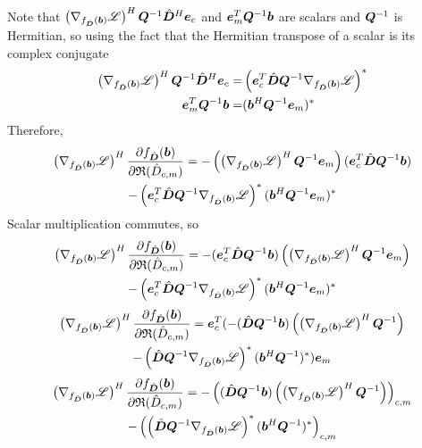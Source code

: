 \begin{appendices}
Note that $\left(\nabla_{f_{\hat{\bm{D}}}(\bm{b})} \mathscr{L}\right)^H\bm{Q}^{-1}\hat{\bm{D}}^H\bm{e}_c$ and $\bm{e}_m^T\bm{Q}^{-1}\bm{b}$ are scalars and $\bm{Q}^{-1}$ is Hermitian, so using the fact that the Hermitian transpose of a scalar is its complex conjugate
\begin{equation}
\begin{split}
\left(\nabla_{f_{\hat{\bm{D}}}(\bm{b})} \mathscr{L}\right)^H\bm{Q}^{-1}\hat{\bm{D}}^H\bm{e}_c = & \left(\bm{e}_c^T\hat{\bm{D}}\bm{Q}^{-1}\nabla_{f_{\hat{\bm{D}}}(\bm{b})} \mathscr{L}\right)^*
\\
\bm{e}_m^T\bm{Q}^{-1}\bm{b} = & (\bm{b}^H\bm{Q}^{-1}\bm{e}_m)^*
\end{split}
\end{equation}
Therefore,
\begin{multline}
\left(\nabla_{f_{\hat{\bm{D}}}(\bm{b})} \mathscr{L}\right)^H\frac{\partial f_{\hat{\bm{D}}}(\bm{b})}{\partial \mathfrak{R}(\hat{D}_{c,m})} = -\left(\left(\nabla_{f_{\hat{\bm{D}}}(\bm{b})} \mathscr{L}\right)^H\bm{Q}^{-1}\bm{e}_m\right)(\bm{e}_c^T\hat{\bm{D}}\bm{Q}^{-1}\bm{b}) \\- \left(\bm{e}_c^T\hat{\bm{D}}\bm{Q}^{-1}\nabla_{f_{\hat{\bm{D}}}(\bm{b})} \mathscr{L}\right)^* (\bm{b}^H\bm{Q}^{-1}\bm{e}_m)^*
\end{multline}
Scalar multiplication commutes, so
\begin{multline}
\left(\nabla_{f_{\hat{\bm{D}}}(\bm{b})} \mathscr{L}\right)^H\frac{\partial f_{\hat{\bm{D}}}(\bm{b})}{\partial \mathfrak{R}(\hat{D}_{c,m})} = -(\bm{e}_c^T\hat{\bm{D}}\bm{Q}^{-1}\bm{b})\left(\left(\nabla_{f_{\hat{\bm{D}}}(\bm{b})} \mathscr{L}\right)^H\bm{Q}^{-1}\bm{e}_m\right) \\- \left(\bm{e}_c^T\hat{\bm{D}}\bm{Q}^{-1}\nabla_{f_{\hat{\bm{D}}}(\bm{b})} \mathscr{L}\right)^* (\bm{b}^H\bm{Q}^{-1}\bm{e}_m)^*
\end{multline}
\begin{multline}
\left(\nabla_{f_{\hat{\bm{D}}}(\bm{b})} \mathscr{L}\right)^H\frac{\partial f_{\hat{\bm{D}}}(\bm{b})}{\partial \mathfrak{R}(\hat{D}_{c,m})} = \bm{e}_c^T(-(\hat{\bm{D}}\bm{Q}^{-1}\bm{b})\left(\left(\nabla_{f_{\hat{\bm{D}}}(\bm{b})} \mathscr{L}\right)^H\bm{Q}^{-1}\right) \\- \left(\hat{\bm{D}}\bm{Q}^{-1}\nabla_{f_{\hat{\bm{D}}}(\bm{b})} \mathscr{L}\right)^* (\bm{b}^H\bm{Q}^{-1})^*)\bm{e}_m
\end{multline}
\begin{multline}
\left(\nabla_{f_{\hat{\bm{D}}}(\bm{b})} \mathscr{L}\right)^H\frac{\partial f_{\hat{\bm{D}}}(\bm{b})}{\partial \mathfrak{R}(\hat{D}_{c,m})} = -\left((\hat{\bm{D}}\bm{Q}^{-1}\bm{b})\left(\left(\nabla_{f_{\hat{\bm{D}}}(\bm{b})} \mathscr{L}\right)^H\bm{Q}^{-1}\right)\right)_{c,m} \\-  \left(\left(\hat{\bm{D}}\bm{Q}^{-1}\nabla_{f_{\hat{\bm{D}}}(\bm{b})} \mathscr{L}\right)^* (\bm{b}^H\bm{Q}^{-1})^*\right)_{c,m}
\end{multline}


\end{appendices}
